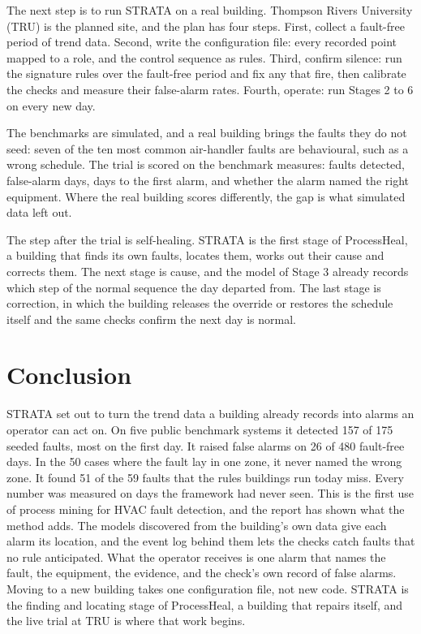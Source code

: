 \documentclass[conference]{IEEEtran}
\begin{document}
The next step is to run STRATA on a real building. Thompson Rivers University (TRU) is the planned site, and the plan has four steps. First, collect a fault-free period of trend data. Second, write the configuration file: every recorded point mapped to a role, and the control sequence as rules. Third, confirm silence: run the signature rules over the fault-free period and fix any that fire, then calibrate the checks and measure their false-alarm rates. Fourth, operate: run Stages 2 to 6 on every new day.

The benchmarks are simulated, and a real building brings the faults they do not seed: seven of the ten most common air-handler faults are behavioural, such as a wrong schedule. The trial is scored on the benchmark measures: faults detected, false-alarm days, days to the first alarm, and whether the alarm named the right equipment. Where the real building scores differently, the gap is what simulated data left out.

The step after the trial is self-healing. STRATA is the first stage of ProcessHeal, a building that finds its own faults, locates them, works out their cause and corrects them. The next stage is cause, and the model of Stage 3 already records which step of the normal sequence the day departed from. The last stage is correction, in which the building releases the override or restores the schedule itself and the same checks confirm the next day is normal.

\section{Conclusion}

STRATA set out to turn the trend data a building already records into alarms an operator can act on. On five public benchmark systems it detected 157 of 175 seeded faults, most on the first day. It raised false alarms on 26 of 480 fault-free days. In the 50 cases where the fault lay in one zone, it never named the wrong zone. It found 51 of the 59 faults that the rules buildings run today miss. Every number was measured on days the framework had never seen. This is the first use of process mining for HVAC fault detection, and the report has shown what the method adds. The models discovered from the building's own data give each alarm its location, and the event log behind them lets the checks catch faults that no rule anticipated. What the operator receives is one alarm that names the fault, the equipment, the evidence, and the check's own record of false alarms. Moving to a new building takes one configuration file, not new code. STRATA is the finding and locating stage of ProcessHeal, a building that repairs itself, and the live trial at TRU is where that work begins.



\end{document}
